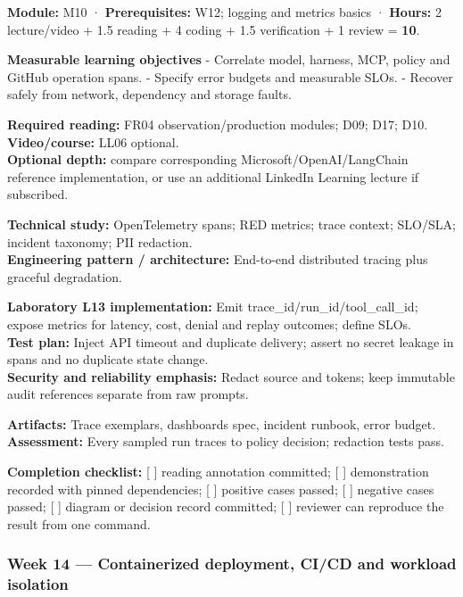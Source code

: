 \documentclass[
  10pt,
]{article}
\begin{document}
\textbf{Module:} M10 · \textbf{Prerequisites:} W12; logging and metrics
basics · \textbf{Hours:} 2 lecture/video + 1.5 reading + 4 coding + 1.5
verification + 1 review = \textbf{10}.

\textbf{Measurable learning objectives} - Correlate model, harness, MCP,
policy and GitHub operation spans. - Specify error budgets and
measurable SLOs. - Recover safely from network, dependency and storage
faults.

\textbf{Required reading:} FR04 observation/production modules; D09;
D17; D10.\\
\textbf{Video/course:} LL06 optional.\\
\textbf{Optional depth:} compare corresponding
Microsoft/OpenAI/LangChain reference implementation, or use an
additional LinkedIn Learning lecture if subscribed.

\textbf{Technical study:} OpenTelemetry spans; RED metrics; trace
context; SLO/SLA; incident taxonomy; PII redaction.\\
\textbf{Engineering pattern / architecture:} End-to-end distributed
tracing plus graceful degradation.

\textbf{Laboratory L13 implementation:} Emit
trace\_id/run\_id/tool\_call\_id; expose metrics for latency, cost,
denial and replay outcomes; define SLOs.\\
\textbf{Test plan:} Inject API timeout and duplicate delivery; assert no
secret leakage in spans and no duplicate state change.\\
\textbf{Security and reliability emphasis:} Redact source and tokens;
keep immutable audit references separate from raw prompts.

\textbf{Artifacts:} Trace exemplars, dashboards spec, incident runbook,
error budget.\\
\textbf{Assessment:} Every sampled run traces to policy decision;
redaction tests pass.

\textbf{Completion checklist:} {[} {]} reading annotation committed; {[}
{]} demonstration recorded with pinned dependencies; {[} {]} positive
cases passed; {[} {]} negative cases passed; {[} {]} diagram or decision
record committed; {[} {]} reviewer can reproduce the result from one
command.

\subsubsection{Week 14 --- Containerized deployment, CI/CD and workload
isolation}\label{week-14-containerized-deployment-cicd-and-workload-isolation}
\end{document}
